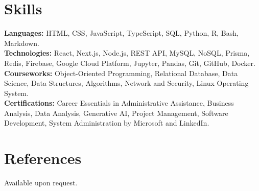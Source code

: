 \documentclass[letterpaper,11pt]{article}
\begin{document}
\section{Skills}
    \begin{itemize}
    [leftmargin=0in, label={}]\small{\item{
        \textbf{Languages:} {HTML, CSS, JavaScript, TypeScript, SQL, Python, R, Bash, Markdown.} \\
        \textbf{Technologies:} {React, Next.js, Node.js, REST API, MySQL, NoSQL, Prisma, Redis, Firebase, Google Cloud Platform, Jupyter, Pandas, Git, GitHub, Docker.} \\
        \textbf{Courseworks:} {Object-Oriented Programming, Relational Database, Data Science, Data Structures, Algorithms, Network and 
Security, Linux Operating System.} \\
        \textbf{Certifications:} {Career Essentials in Administrative Assistance, Business Analysis, Data Analysis, Generative AI, Project Management, Software Development, System Administration by Microsoft and LinkedIn.} \\}}
    \end{itemize}


\section{References}
  \small{Available upon request.}
\end{document}

